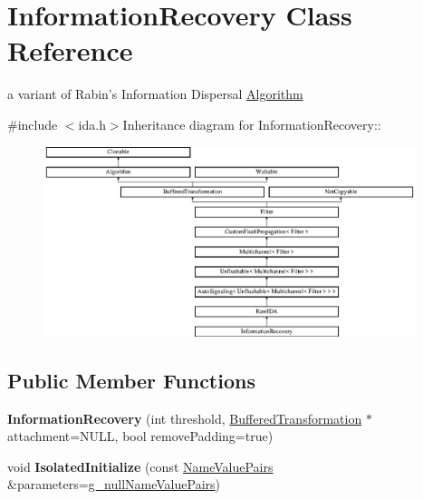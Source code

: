 \hypertarget{class_information_recovery}{
\section{InformationRecovery Class Reference}
\label{class_information_recovery}
}


a variant of Rabin's Information Dispersal \hyperlink{class_algorithm}{Algorithm}  


{\ttfamily \#include $<$ida.h$>$}Inheritance diagram for InformationRecovery::\begin{figure}[H]
\begin{center}
\leavevmode
\includegraphics[height=5.53907cm]{class_information_recovery}
\end{center}
\end{figure}
\subsection*{Public Member Functions}
\begin{DoxyCompactItemize}
\item 
\hypertarget{class_information_recovery_a2722185d09cec0d2adbbc2822982281a}{
{\bfseries InformationRecovery} (int threshold, \hyperlink{class_buffered_transformation}{BufferedTransformation} $\ast$attachment=NULL, bool removePadding=true)}
\label{class_information_recovery_a2722185d09cec0d2adbbc2822982281a}

\item 
\hypertarget{class_information_recovery_addaa1b3de9087ae7be368086fc1108a5}{
void {\bfseries IsolatedInitialize} (const \hyperlink{class_name_value_pairs}{NameValuePairs} \&parameters=\hyperlink{cryptlib_8h_ab1b0f7d11a21c6163be8ca2662ce2ac6}{g\_\-nullNameValuePairs})}
\label{class_information_recovery_addaa1b3de9087ae7be368086fc1108a5}

\end{DoxyCompactItemize}
